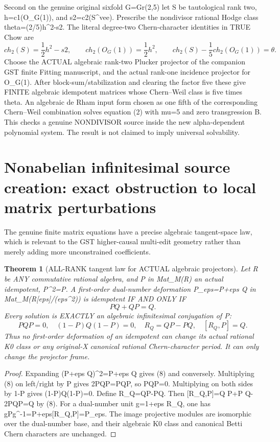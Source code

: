 \documentclass[11pt]{article}
\newtheorem{theorem}{Theorem}[section]
\begin{document}
Second on the genuine original sixfold
G=Gr(2,5) let S be tautological rank two,
h=c1(O_G(1)), and s2=c2(S^vee).
Prescribe the nondivisor rational Hodge class
theta=(2/5)h^2-s2. The literal degree-two
Chern-character identities in TRUE Chow are
\[
 ch_2(S)=\frac12h^2-s2,\qquad
 ch_2(O_G(1))=\frac12h^2,\qquad
 \boxed{ch_2(S)-\frac15ch_2(O_G(1))=\theta.}
 \tag{7}
\]
Choose the ACTUAL algebraic rank-two Plucker projector
of the companion GST finite Fitting manuscript,
and the actual rank-one incidence projector
for O_G(1). After block-sum/stabilization and
clearing the factor five these give FINITE algebraic
idempotent matrices whose Chern--Weil class is five times theta.
An algebraic de Rham input form chosen as one fifth of the
corresponding Chern--Weil combination solves equation (2)
with mu=5 and zero transgression B.
This checks a genuine NONDIVISOR source inside the
new alpha-dependent polynomial system.
The result is not claimed to imply universal solvability.

\section{Nonabelian infinitesimal source creation: exact obstruction to local matrix perturbations}
The genuine finite matrix equations have
a precise algebraic tangent-space law,
which is relevant to the GST higher-causal
multi-edit geometry rather than merely
adding more unconstrained coefficients.

\begin{theorem}[ALL-RANK tangent law for ACTUAL algebraic projectors]
Let R be ANY commutative rational algebra, and
P in Mat_M(R) an actual idempotent, P^2=P.
A first-order dual-number deformation
P_eps=P+eps Q in Mat_M(R[eps]/(eps^2))
is idempotent IF AND ONLY IF
\[
 \boxed{PQ+QP=Q.}                                      \tag{8}
\]
Every solution is EXACTLY an algebraic
infinitesimal conjugation of P:
\[
 \boxed{
 PQP=0,\quad (1-P)Q(1-P)=0,\quad
 R_Q=QP-PQ,\quad [R_Q,P]=Q.
 }                                                       \tag{9}
\]
Thus no first-order deformation of an idempotent
can change its actual rational K0 class or any
original-X canonical rational Chern-character period.
It can only change the projector frame.
\end{theorem}
\begin{proof}
Expanding (P+eps Q)^2=P+eps Q
gives (8) and conversely.
Multiplying (8) on left/right by P gives
2PQP=PQP, so PQP=0. Multiplying
on both sides by 1-P gives
(1-P)Q(1-P)=0. Define R_Q=QP-PQ.
Then
[R_Q,P]=Q P+P Q-2PQP=Q by (8).
For a dual-number unit g=1+eps R_Q,
one has gPg^{-1}=P+eps[R_Q,P]=P_eps.
The image projective modules are isomorphic
over the dual-number base, and their
algebraic K0 class and canonical Betti
Chern characters are unchanged.
\end{proof}
\end{document}
